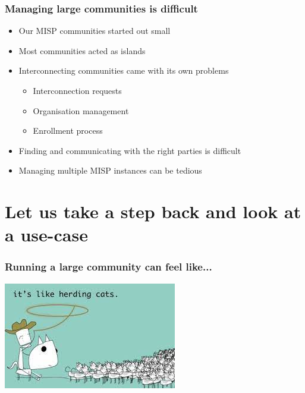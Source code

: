 \begin{frame}
\frametitle{Managing large communities is difficult}
    \begin{itemize}
        \item Our MISP communities started out small
        \item Most communities acted as islands
        \item Interconnecting communities came with its own problems
        \begin{itemize}
            \item Interconnection requests
            \item Organisation management
            \item Enrollment process
        \end{itemize}
        \item Finding and communicating with the right parties is difficult
        \item Managing multiple MISP instances can be tedious
    \end{itemize}
\end{frame}

\section{Let us take a step back and look at a use-case}

\begin{frame}
\frametitle{Running a large community can feel like...}
    \begin{center}
	    \includegraphics[width=1\linewidth]{pictures/herding_cats.jpeg}
    \end{center}
\end{frame}

